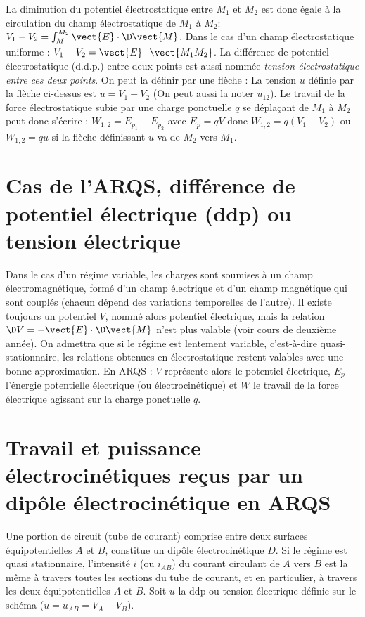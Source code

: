 La diminution du potentiel électrostatique entre $M_1$ et $M_2$ est donc égale à la circulation du champ électrostatique de $M_1$ à $M_2$: $V_1-V_2 = \int_{M_1}^{M_2} \vect{E} \cdot \D \vect{M}$.
Dans le cas d'un champ électrostatique uniforme : $V_1-V_2 = \vect{E} \cdot \vect{M_1M_2}$.
La différence de potentiel électrostatique (d.d.p.) entre deux points est aussi nommée \emph{tension électrostatique entre ces deux points}. On peut la définir par une flèche :
La tension $u$ définie par la flèche ci-dessus est $u=V_1-V_2$ (On peut aussi la noter $u_{12}$). Le travail de la force électrostatique subie par une charge ponctuelle $q$ se déplaçant de $M_1$ à $M_2$ peut donc s'écrire : $W_{1,2} = E_{p_1} - E_{p_2}$ avec $E_p = q V$ donc $W_{1,2} = q(V_1-V_2)$ ou  $W_{1,2} = q u$ si la flèche définissant $u$ va de $M_2$ vers $M_1$.

\section{Cas de l'ARQS, différence de potentiel électrique (ddp) ou tension électrique}
\label{chap9-sec:casdelARQS}

Dans le cas d'un régime variable, les charges sont soumises à un champ électromagnétique, formé d'un champ électrique et d'un champ magnétique qui sont couplés (chacun dépend des variations temporelles de l'autre). Il existe toujours un potentiel $V$, nommé alors potentiel électrique, mais la relation $\D V = -\vect{E} \cdot \D \vect{M}$ n'est plus valable (voir cours de deuxième année).
On admettra que si le régime est lentement variable, c'est-à-dire quasi-stationnaire, les relations obtenues en électrostatique restent valables avec une bonne approximation.
En ARQS : $V$ représente alors le potentiel électrique, $E_p$ l'énergie potentielle électrique (ou électrocinétique) et $W$ le travail de la force électrique agissant sur la charge ponctuelle $q$.

\section{Travail et puissance électrocinétiques reçus par un dipôle électrocinétique en ARQS}
\label{chap9-sec:travailetpuissance}

Une portion de circuit (tube de courant) comprise entre deux surfaces équipotentielles $A$ et $B$, constitue un dipôle électrocinétique $D$. Si le régime est quasi stationnaire, l'intensité $i$ (ou $i_{AB}$)  du courant circulant de $A$ vers $B$ est la même à travers toutes les sections du tube de courant, et en particulier, à travers les deux équipotentielles $A$ et $B$. Soit $u$ la ddp ou tension électrique définie sur le schéma ($u = u_{AB} = V_A - V_B$). 

